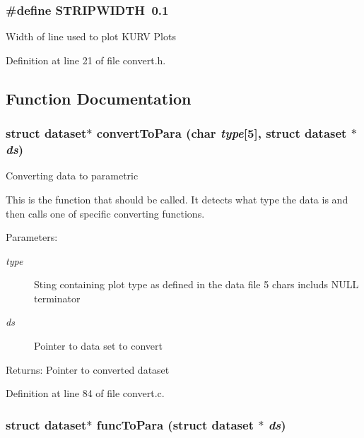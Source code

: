 \subsubsection{\setlength{\rightskip}{0pt plus 5cm}\#define STRIPWIDTH\ 0.1}\label{convert_8h_a0}


Width of line used to plot KURV Plots 

Definition at line 21 of file convert.h.

\subsection{Function Documentation}
\subsubsection{\setlength{\rightskip}{0pt plus 5cm}struct {\bf dataset}$\ast$ convert\-To\-Para (char {\em type}[5], struct {\bf dataset} $\ast$ {\em ds})}\label{convert_8h_a3}


Converting data to parametric

This is the function that should be called. It detects what type the data is and then calls one of specific converting functions.

\begin{Desc}
\item[Parameters:]
\begin{description}
\item[{\em type}]Sting containing plot type as defined in the data file 5 chars includs NULL terminator \item[{\em ds}]Pointer to data set to convert \end{description}
\end{Desc}
\begin{Desc}
\item[Returns:]Pointer to converted dataset \end{Desc}


Definition at line 84 of file convert.c.
\subsubsection{\setlength{\rightskip}{0pt plus 5cm}struct {\bf dataset}$\ast$ func\-To\-Para (struct {\bf dataset} $\ast$ {\em ds})}\label{convert_8h_a1}


